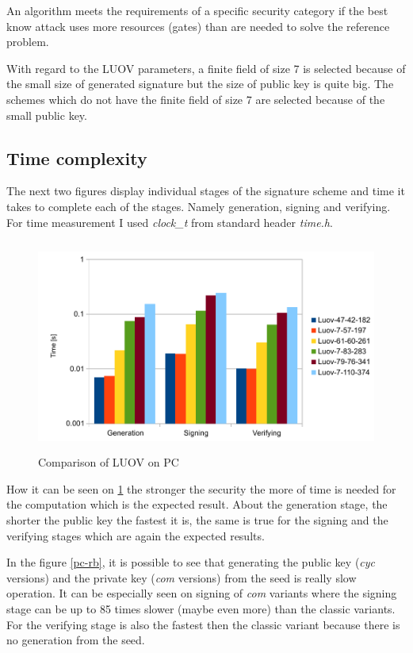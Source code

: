 \documentclass[thesis=M,english]{FITthesis}[2019/12/23]
\begin{document}
\bigskip
\noindent
An algorithm meets the requirements of a specific security category if the best know attack uses more resources (gates) than are needed to solve the reference problem.

\bigskip
\noindent
With regard to the LUOV parameters, a finite field of size 7 is selected because of the small size of generated signature but the size of public key is quite big. The schemes which do not have the finite field of size 7 are selected because of the small public key.

\subsection{Time complexity} \label{time-complex-pc}
The next two figures display individual stages of the signature scheme and time it takes to complete each of the stages. Namely generation, signing and verifying. For time measurement I used \textit{clock\_t} from standard header \textit{time.h}. 
\begin{figure}[H]
\centering
\includegraphics[width=13cm,height=7cm]{images/pc-luov.pdf}
\caption{Comparison of LUOV on PC}
\label{pc-luov}
\end{figure}

\noindent
How it can be seen on \ref{pc-luov} the stronger the security the more of time is needed for the computation which is the expected result. About the generation stage, the shorter the public key the fastest it is, the same is true for the signing and the verifying stages which are again the expected results.

\bigskip
\noindent
In the figure \ref{pc-rb}, it is possible to see that generating the public key (\textit{cyc} versions) and the private key (\textit{com} versions) from the seed is really slow operation. It can be especially seen on signing of \textit{com} variants where the signing stage can be up to 85 times slower (maybe even more) than the classic variants. For the verifying stage is also the fastest then the classic variant because there is no generation from the seed.
\end{document}
